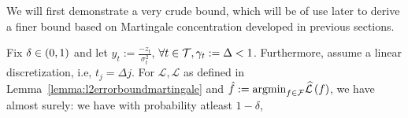 We will first demonstrate a very crude bound, which will be of use later to derive a finer bound based on Martingale concentration developed in previous sections. 
\begin{lemma}\label{lemma:squared_error_crude_bound}
    Fix $\delta \in \left(0,1\right)$ and let $y_{t} := \frac{-z_{t}}{\sigma_t^{2}}$,  $\forall t\in \mathcal{T}, \gamma_{t} := \Delta < 1$. Furthermore, assume a linear discretization, i.e, $t_{j} = \Delta j$. For $\mathcal{L}, \widehat{\mathcal{L}}$ as defined in Lemma~\ref{lemma:l2errorboundmartingale} and $\hat{f} := \textup{argmin}_{f \in \mathcal{F}}\widehat{\mathcal{L}}\left(f\right)$, we have almost surely:
    we have with probability atleast $1-\delta$, 
\end{lemma}
